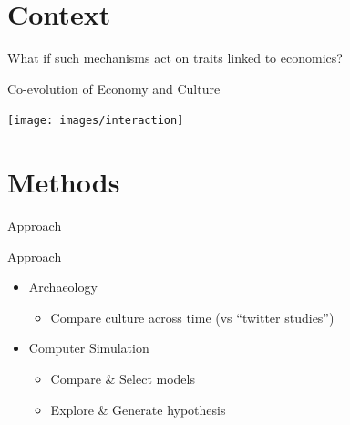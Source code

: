 \documentclass[12pt, notes=show]{beamer}
\begin{document}
\section{Context}


\begin{frame}
	\begin{center}
	    What if such mechanisms act on traits linked to economics?
	\end{center}
	\begin{center}
	\end{center}
\end{frame}

%
\begin{frame}{Co-evolution of Economy and Culture}

    \begin{center}
	\texttt{[image: images/interaction]}	
    \end{center}

\end{frame}



\section{Methods}
\begin{frame}
    \centering
    \Large
    Approach
\end{frame}


\begin{frame}{Approach}
    \begin{itemize}
	\item Archaeology
	    \begin{itemize}
		\item<2-> Compare culture across time (vs ``twitter studies'')
	    \end{itemize}
	    \vfill
	\item<3-> Computer Simulation
	    \begin{itemize}
		\item<4-> Compare \& Select models
		\item<5-> Explore \& Generate hypothesis
	    \end{itemize}
	    \vfill
    \end{itemize}
\end{frame}
\end{document}
